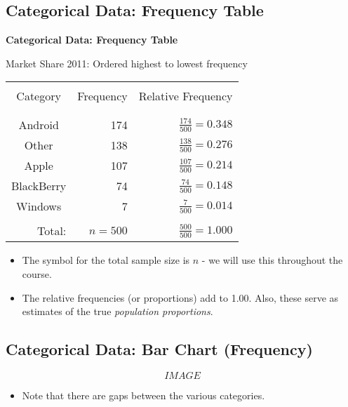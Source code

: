 \documentclass[]{report}
\begin{document}
\subsection{Categorical Data: Frequency Table}
{ \textbf{Categorical Data: Frequency Table}\\[-1cm]}
\begin{center}
Market Share 2011: Ordered highest to lowest frequency\\[0.1cm]
\begin{tabular}{|c|r|r|}
\hline
&&\\[-0.4cm]
Category   & Frequency & Relative Frequency \\
&&\\[-0.5cm]
\hline
&&\\[-0.4cm]
Android    &   174     & $\tfrac{174}{500} = 0.348$ \\[0.2cm]
Other      &   138     & $\tfrac{138}{500} = 0.276$ \\[0.2cm]
Apple      &   107     & $\tfrac{107}{500} = 0.214$ \\[0.2cm]
BlackBerry &    74     & $\tfrac{74}{500} = 0.148$ \\[0.2cm]
Windows    &     7     & $\tfrac{7}{500} = 0.014$ \\[0.2cm]
\hline
&&\\[-0.4cm]
\multicolumn{1}{|r|}{Total:} & $n = 500$ & $\tfrac{500}{500} = 1.000$ \\[0.1cm]
\hline
\end{tabular}
\end{center}
\begin{itemize}\itemsep0.2cm
\item The symbol for the total sample size is {\boldmath$n$} - we will use this throughout the course.
\item The relative frequencies (or proportions) add to 1.00. Also, these serve as estimates of the true \emph{population proportions}.
\end{itemize}





\subsection{Categorical Data: Bar Chart (Frequency)}
\[IMAGE\]
\begin{itemize}\itemsep0.2cm
\item Note that there are { gaps} between the various categories.
\end{itemize}
\end{document}
